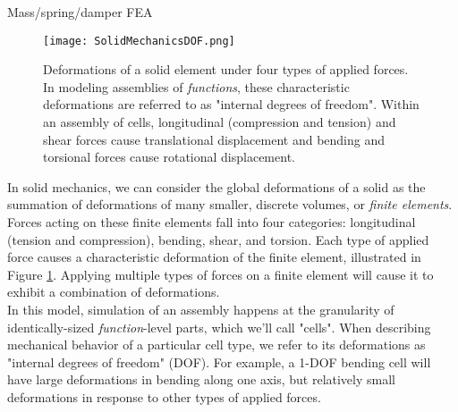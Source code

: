 {Mass/spring/damper
FEA


\begin{figure}
  \texttt{[image: SolidMechanicsDOF.png]}
  \caption{Deformations of a solid element under four types of applied forces.  In modeling assemblies of \textit{functions}, these characteristic deformations are referred to as "internal degrees of freedom".  Within an assembly of cells, longitudinal (compression and tension) and shear forces cause translational displacement and bending and torsional forces cause rotational displacement.}
  \label{fig:SolidMechanicsDOF}
\end{figure}

In solid mechanics, we can consider the global deformations of a solid as the summation of deformations of many smaller, discrete volumes, or \textit{finite elements}.  Forces acting on these finite elements fall into four categories: longitudinal (tension and compression), bending, shear, and torsion.  Each type of applied force causes a characteristic deformation of the finite element, illustrated in Figure \ref{fig:SolidMechanicsDOF}.  Applying multiple types of forces on a finite element will cause it to exhibit a combination of deformations.\\

In this model, simulation of an assembly happens at the granularity of identically-sized \textit{function}-level parts, which we'll call "cells".  When describing mechanical behavior of a particular cell type, we refer to its deformations as "internal degrees of freedom" (DOF).  For example, a 1-DOF bending cell will have large deformations in bending along one axis, but relatively small deformations in response to other types of applied forces.\\


}
